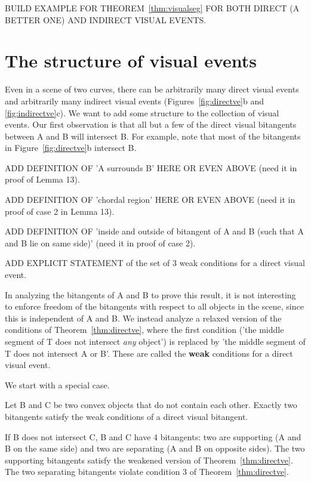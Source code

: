 \documentclass[12pt]{article}
\begin{document}
BUILD EXAMPLE FOR THEOREM~\ref{thm:visualseg} 
FOR BOTH DIRECT (A BETTER ONE) AND INDIRECT VISUAL EVENTS.

\clearpage


\section{The structure of visual events}
\label{sec:structureve}

Even in a scene of two curves,
there can be arbitrarily many direct visual events
and arbitrarily many indirect visual events (Figures~\ref{fig:directve}b 
and \ref{fig:indirectve}c).
We want to add some structure to the collection of visual events.
Our first observation is that all but a few of the direct visual bitangents 
between A and B will intersect B.
For example, note that most of the bitangents in Figure~\ref{fig:directve}b intersect B.

ADD DEFINITION OF 'A surrounds B' HERE OR EVEN ABOVE (need it in proof of Lemma 13).

ADD DEFINITION OF 'chordal region' HERE OR EVEN ABOVE (need it in proof of case 2 in Lemma 13).

ADD DEFINITION OF 'inside and outside of bitangent of A and B (such that A and B lie on same side)'
(need it in proof of case 2).

ADD EXPLICIT STATEMENT of the set of 3 weak conditions for a direct visual event.

In analyzing the bitangents of A and B to prove this result, 
it is not interesting to enforce freedom of the bitangents 
with respect to all objects in the scene, since this is independent of A and B.
We instead analyze a relaxed version of the conditions of Theorem~\ref{thm:directve}, 
where the first condition ('the middle segment of T does not intersect
{\em any} object') is replaced by 'the middle segment of T does not intersect A or B'.
These are called the {\bf weak} conditions for a direct visual event.

We start with a special case.

\begin{lemma}
\label{lem:convex}
Let B and C be two convex objects that do not contain each other.
Exactly two bitangents satisfy the weak conditions of a direct visual bitangent.
\end{lemma}
\prf
If B does not intersect C, B and C have 4 bitangents:
two are supporting (A and B on the same side)
and two are separating (A and B on opposite sides).
The two supporting bitangents satisfy the weakened version of Theorem~\ref{thm:directve}.
The two separating bitangents violate condition 3 of Theorem~\ref{thm:directve}.
\end{document}

